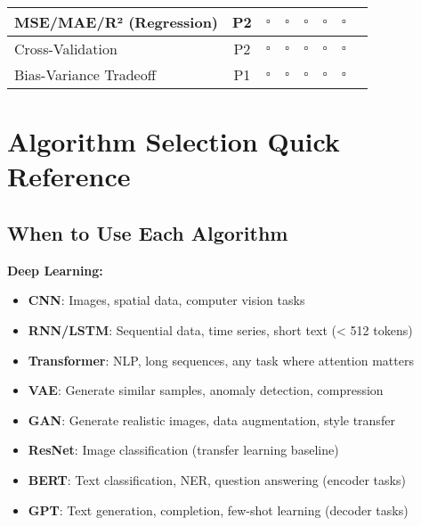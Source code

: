 \documentclass[10pt]{article}
\begin{document}
\begin{center}
\begin{longtable}{|p{3.5cm}|c|c|c|c|c|c|p{3cm}|}
MSE/MAE/R² (Regression) & P2 & $\square$ & $\square$ & $\square$ & $\square$ & $\square$ & \\
\hline

Cross-Validation & P2 & $\square$ & $\square$ & $\square$ & $\square$ & $\square$ & \\
\hline

Bias-Variance Tradeoff & P1 & $\square$ & $\square$ & $\square$ & $\square$ & $\square$ & \\
\hline

\end{longtable}
\end{center}

\newpage

\section{Algorithm Selection Quick Reference}

\subsection{When to Use Each Algorithm}

\textbf{Deep Learning:}
\begin{itemize}
\item \textbf{CNN}: Images, spatial data, computer vision tasks
\item \textbf{RNN/LSTM}: Sequential data, time series, short text (< 512 tokens)
\item \textbf{Transformer}: NLP, long sequences, any task where attention matters
\item \textbf{VAE}: Generate similar samples, anomaly detection, compression
\item \textbf{GAN}: Generate realistic images, data augmentation, style transfer
\item \textbf{ResNet}: Image classification (transfer learning baseline)
\item \textbf{BERT}: Text classification, NER, question answering (encoder tasks)
\item \textbf{GPT}: Text generation, completion, few-shot learning (decoder tasks)
\end{itemize}
\end{document}
